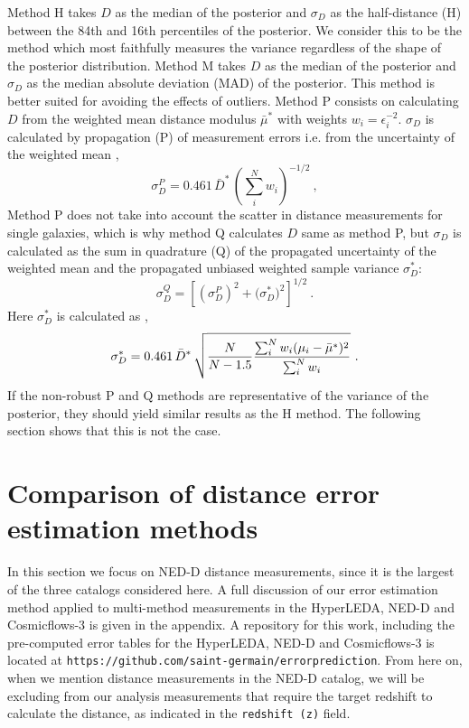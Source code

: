 \documentclass[a4paper,fleqn,usenatbib]{mnras}
\begin{document}
Method H takes $D$ as the median of the posterior and $\sigma_D$ as the half-distance (H) between the 84th and 16th percentiles of the posterior. We consider this to be the method which most faithfully measures the variance regardless of the shape of the posterior distribution. Method M takes $D$ as the median of the posterior and $\sigma_D$ as the median absolute deviation (MAD) of the posterior. This method is better suited for avoiding the effects of outliers. Method P consists on calculating $D$ from the weighted mean distance modulus $\bar{\mu}^*$ with weights $w_i=\epsilon_i^{-2}$. $\sigma_D$ is calculated by propagation (P) of measurement errors  i.e. from the uncertainty of the weighted mean \citep{cosmicflows},
\begin{equation}
\sigma_D^P=0.461\,\bar{D}^*\,\left(\sum_i^Nw_i\right)^{-1/2} \ ,
\end{equation}
Method P does not take into account the scatter in distance measurements for single galaxies, which is why method Q calculates $D$ same as method P, but $\sigma_D$ is calculated as the sum in quadrature (Q) of the propagated uncertainty of the weighted mean and the propagated unbiased weighted sample variance $\sigma_D^*$:
\begin{equation}
\sigma_D^Q=\left[ \left(\sigma_D^P\right)^2+\Big(\sigma_D^*\Big)^2\right]^{1/2} \ .
\end{equation}
Here $\sigma^*_D$ is calculated as  \citep{wstdev},
\begin{equation}
\sigma^*_D=0.461\,\bar{D}^*\,\sqrt{\frac{N}{N-1.5}\frac{\sum_i^Nw_i(\mu_i-\bar{\mu}^*)^2}{\sum_i^Nw_i}\vphantom{\Biggl(}}\ .
\end{equation}
If the non-robust P and Q methods are representative of the variance of the posterior, they should yield similar results as the H method. The following section shows that this is not the case.

\section{Comparison of distance error estimation methods}
\label{sec:comp} 


In this section we focus on NED-D distance measurements, since it is the largest of the three catalogs considered here. A full discussion of our error estimation method applied to multi-method measurements in the HyperLEDA, NED-D and Cosmicflows-3 is given in the appendix. A repository for this work, including the pre-computed error tables for the HyperLEDA, NED-D and Cosmicflows-3 is located at \texttt{https://github.com/saint-germain/errorprediction}. From here on, when we mention distance measurements in the NED-D catalog, we will be excluding from our analysis measurements that require the target redshift to calculate the distance, as indicated in the \texttt{redshift (z)} field.\\
\end{document}
